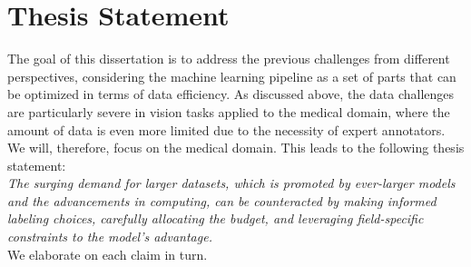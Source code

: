 \section{Thesis Statement}
The goal of this dissertation is to address the previous challenges from different perspectives, considering the machine learning pipeline as a set of parts that can be optimized in terms of data efficiency. As discussed above, the data challenges are particularly severe in vision tasks applied to the medical domain, where the amount of data is even more limited due to the necessity of expert annotators. We will, therefore, focus on the medical domain. This leads to the following thesis statement:
\\%

\textit{The surging demand for larger datasets, which is promoted by ever-larger models and the advancements in computing, can be counteracted by making informed labeling choices, carefully allocating the budget, and leveraging field-specific constraints to the model's advantage.}
\\

We elaborate on each claim in turn.